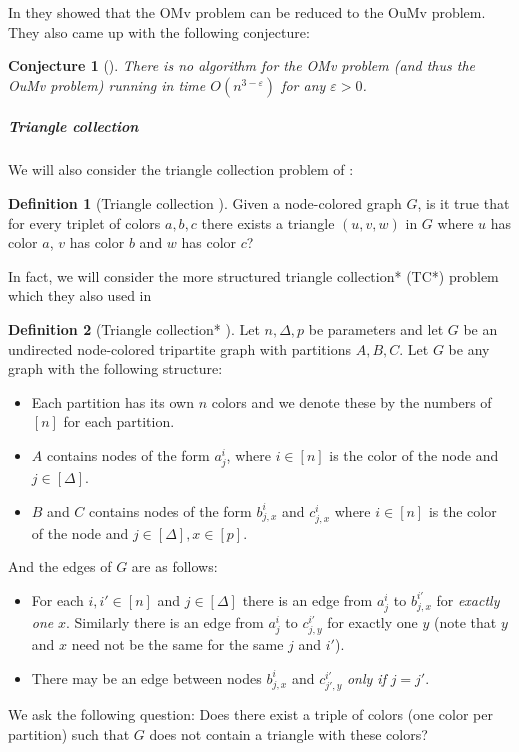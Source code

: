 \documentclass[a4paper,11pt]{article}
\newcommand{\eps}{\varepsilon}
\newtheorem{conjecture}{Conjecture}
\theoremstyle{definition}
\newtheorem{definition}{Definition}
\begin{document}
In \cite{HenzingerKNS15} they showed that the OMv problem can be reduced to the
OuMv problem. They also came up with the following conjecture:

\begin{conjecture}[\cite{HenzingerKNS15}]\label{conj:omv}
    There is no algorithm for the OMv problem (and thus the OuMv problem)
    running in time $O(n^{3-\eps})$ for any $\eps>0$.
\end{conjecture}

\subparagraph*{Triangle collection}

We will also consider the triangle collection problem of \cite{AbboudVY15}:

\begin{definition}[Triangle collection \cite{AbboudVY15}]
    Given a node-colored graph $G$, is it true that for every triplet of colors
    $a,b,c$ there exists a triangle $(u,v,w)$ in $G$ where $u$ has color $a$,
    $v$ has color $b$ and $w$ has color $c$?
\end{definition}

In fact, we will consider the more structured triangle collection* (TC*)
problem which they also used in \cite{AbboudVY15}

\begin{definition}[Triangle collection* \cite{AbboudVY15}]
    Let $n,\Delta,p$ be parameters and let $G$ be an undirected node-colored
    tripartite graph with partitions $A,B,C$. Let $G$ be any graph with the
    following structure:
    \begin{itemize}
        \item Each partition has its own $n$ colors and we denote these by the
            numbers of $[n]$ for each partition.
        \item $A$ contains nodes of the form $a^i_j$, where $i\in [n]$ is the
            color of the node and $j\in [\Delta]$.
        \item $B$ and $C$ contains nodes of the form $b^i_{j,x}$ and
            $c^i_{j,x}$ where $i\in [n]$ is the color of the node and $j\in
            [\Delta], x\in [p]$.
    \end{itemize}
    And the edges of $G$ are as follows:
    \begin{itemize}
        \item For each $i,i'\in [n]$ and $j\in [\Delta]$ there is an edge from
            $a^i_j$ to $b^{i'}_{j,x}$ for \emph{exactly one} $x$. Similarly
            there is an edge from $a^i_j$ to $c^{i'}_{j,y}$ for exactly one $y$
            (note that $y$ and $x$ need not be the same for the same $j$ and
            $i'$).
        \item There may be an edge between nodes $b^i_{j,x}$ and
            $c^{i'}_{j',y}$ \emph{only if} $j=j'$.
    \end{itemize}
    We ask the following question: Does there exist a triple of colors (one
    color per partition) such that $G$ does not contain a triangle with these
    colors?
\end{definition}
\end{document}
